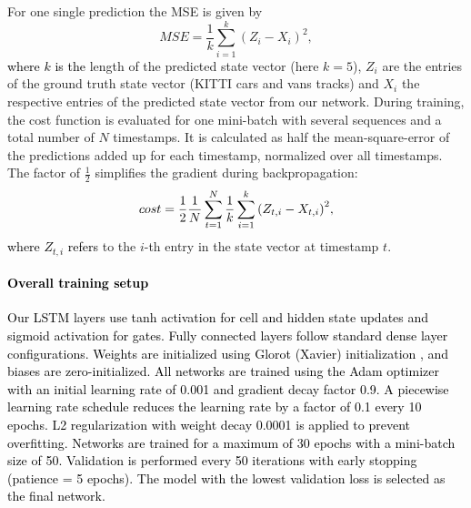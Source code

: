 \documentclass[letterpaper, 10 pt, journal, twoside]{IEEEtran}
\newcommand{\red}[1]{\textcolor{black}{#1}}
\begin{document}
For one single prediction the \ac{MSE} is given by
\begin{equation}
	MSE = \frac{1}{k}\sum_{i=1}^{k}{({Z}_i-{{X}}_i)}^2,
\end{equation}
\noindent
\red{where $k$ is the} length of the predicted state vector (here $k=5$), $Z_i$ are the entries of the ground truth state vector (KITTI cars and vans tracks) and ${X}_i$ the respective entries of the predicted state vector from our network.
During training, the cost function is evaluated for one mini-batch with several sequences and a total number of $N$ timestamps.
It is calculated as half the mean-square-error of the predictions added up for each timestamp, normalized over all timestamps.
The factor of $\frac{1}{2}$ simplifies the gradient during backpropagation:
\begin{equation}
	\red{cost = \frac{1}{2}\frac{1}{N} \sum_{t=1}^{N}\frac{1}{k}\sum_{i=1}^{k}{({Z_{t,i}}-{{X}_{t,i}})}^2},
\end{equation}
\noindent
\red{where $Z_{t,i}$ refers} to the $i$-th entry in the state vector at timestamp $t$.

\paragraph{\red{Overall training setup}}
\red{Our \ac{LSTM} layers use tanh activation for cell and hidden state updates and sigmoid activation for gates. Fully connected layers follow standard dense layer configurations. Weights are initialized using Glorot (Xavier) initialization {\cite{DL_FC.2010}}, and biases are zero-initialized.
All networks are trained using the Adam optimizer with an initial learning rate of 0.001 and gradient decay factor 0.9.
A piecewise learning rate schedule reduces the learning rate by a factor of 0.1 every 10 epochs.
L2 regularization with weight decay 0.0001 is applied to prevent overfitting.
Networks are trained for a maximum of 30 epochs with a mini-batch size of 50.
Validation is performed every 50 iterations with early stopping (patience = 5 epochs).
The model with the lowest validation loss is selected as the final network.}
\end{document}

